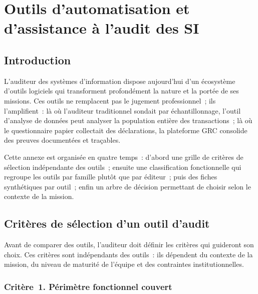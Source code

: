 \chapter{Outils d'automatisation et d'assistance à l'audit des SI}
\label{annexe:outils-audit}

\section*{Introduction}

L'auditeur des systèmes d'information dispose aujourd'hui d'un écosystème
d'outils logiciels qui transforment profondément la nature et la portée de
ses missions. Ces outils ne remplacent pas le jugement professionnel~; ils
l'amplifient~: là où l'auditeur traditionnel sondait par échantillonnage,
l'outil d'analyse de données peut analyser la population entière des
transactions~; là où le questionnaire papier collectait des déclarations,
la plateforme GRC consolide des preuves documentées et traçables.

Cette annexe est organisée en quatre temps~: d'abord une grille de critères
de sélection indépendante des outils~; ensuite une classification fonctionnelle
qui regroupe les outils par famille plutôt que par éditeur~; puis des fiches
synthétiques par outil~; enfin un arbre de décision permettant de choisir
selon le contexte de la mission.

\section{Critères de sélection d'un outil d'audit}
\label{sec:criteres-outils}

Avant de comparer des outils, l'auditeur doit définir les critères qui
guideront son choix. Ces critères sont indépendants des outils~: ils
dépendent du contexte de la mission, du niveau de maturité de l'équipe
et des contraintes institutionnelles.

\subsection*{Critère~1. Périmètre fonctionnel couvert}


